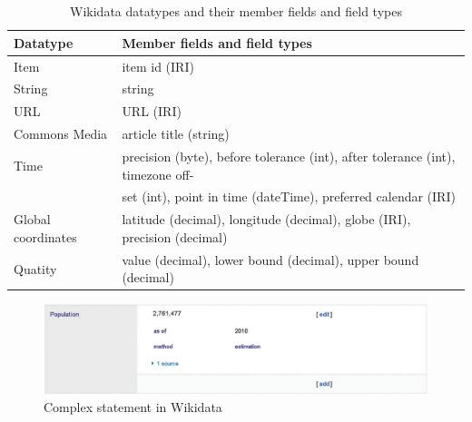 ﻿\documentclass[11pt,titlepage,oneside,openany]{book}
\begin{document}
\\
\\
\begin{table}[h]
\begin{center}
\begin{footnotesize}
\begin{tabular*}{\textwidth}{|l|l|}
\hline
Datatype & Member fields and field types\\ \hline
Item & item id (IRI) \\
String & string \\
URL & URL (IRI) \\
Commons Media & article title (string) \\
Time & precision (byte), before tolerance (int), after tolerance (int), timezone off- \\
& set (int), point in time (dateTime), preferred calendar (IRI) \\ 
Global coordinates & latitude (decimal), longitude (decimal), globe (IRI), precision (decimal) \\
Quatity & value (decimal), lower bound (decimal), upper bound (decimal) \\ \hline
\end{tabular*}
\end{footnotesize}
\caption[Wikidata datatypes]{Wikidata datatypes and their member fields and field types \cite{Erxleben2014IntroducingWT}}
\label{tab:wikidata-datatypes}
\end{center}
\end{table}
\begin{figure}
	\begin{center}
	\includegraphics[width=13cm]{./figures/complex-statement-wikidata.png}
	\caption[Complex statement]{Complex statement in Wikidata \cite{AFCK01}}
	\label{fig:complex-statement-wikidata}
	\end{center}
\end{figure}
\end{document}
